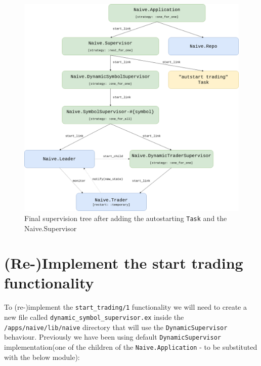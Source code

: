 \documentclass[
]{book}
\begin{document}
\begin{figure}
\centering
\includegraphics{images/chapter_12_02_sup_diagram.png}
\caption{Final supervision tree after adding the autostarting \texttt{Task} and the Naive.Supervisor}
\end{figure}

\hypertarget{re-implement-the-start-trading-functionality}{%
\section{(Re-)Implement the start trading functionality}\label{re-implement-the-start-trading-functionality}}

To (re-)implement the \texttt{start\_trading/1} functionality we will need to create a new file called \texttt{dynamic\_symbol\_supervisor.ex} inside the \texttt{/apps/naive/lib/naive} directory that will use the \texttt{DynamicSupervisor} behaviour. Previously we have been using default \texttt{DynamicSupervisor} implementation(one of the children of the \texttt{Naive.Application} - to be substituted with the below module):
\end{document}
